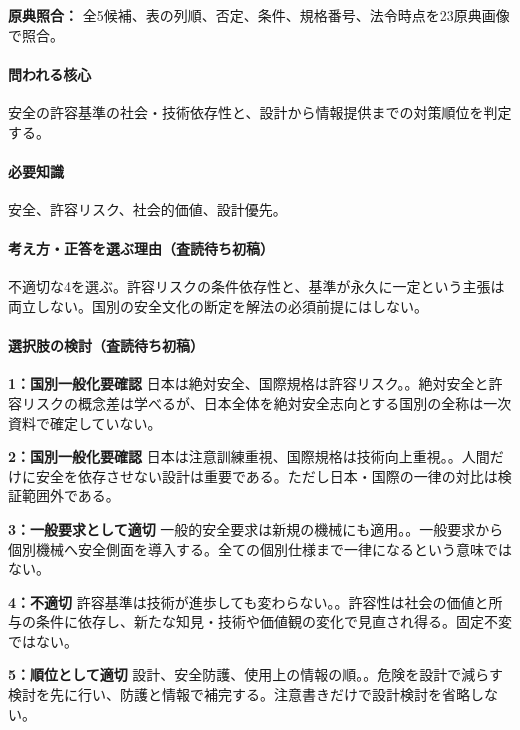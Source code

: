\noindent\textbf{原典照合：} 全5候補、表の列順、否定、条件、規格番号、法令時点を23原典画像で照合。\par

\paragraph{問われる核心} 安全の許容基準の社会・技術依存性と、設計から情報提供までの対策順位を判定する。

\paragraph{必要知識} 安全、許容リスク、社会的価値、設計優先。

\paragraph{考え方・正答を選ぶ理由（査読待ち初稿）} 不適切な4を選ぶ。許容リスクの条件依存性と、基準が永久に一定という主張は両立しない。国別の安全文化の断定を解法の必須前提にはしない。

\paragraph{選択肢の検討（査読待ち初稿）}\mbox{}\par

\noindent\textbf{1：国別一般化要確認} 日本は絶対安全、国際規格は許容リスク。。絶対安全と許容リスクの概念差は学べるが、日本全体を絶対安全志向とする国別の全称は一次資料で確定していない。\par

\noindent\textbf{2：国別一般化要確認} 日本は注意訓練重視、国際規格は技術向上重視。。人間だけに安全を依存させない設計は重要である。ただし日本・国際の一律の対比は検証範囲外である。\par

\noindent\textbf{3：一般要求として適切} 一般的安全要求は新規の機械にも適用。。一般要求から個別機械へ安全側面を導入する。全ての個別仕様まで一律になるという意味ではない。\par

\noindent\textbf{4：不適切} 許容基準は技術が進歩しても変わらない。。許容性は社会の価値と所与の条件に依存し、新たな知見・技術や価値観の変化で見直され得る。固定不変ではない。\par

\noindent\textbf{5：順位として適切} 設計、安全防護、使用上の情報の順。。危険を設計で減らす検討を先に行い、防護と情報で補完する。注意書きだけで設計検討を省略しない。\par

